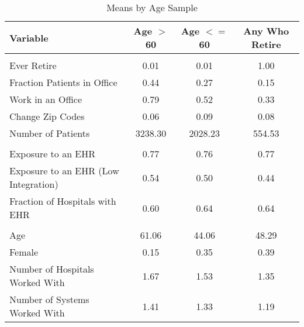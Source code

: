 \begin{table}[ht]

\caption{Means by Age Sample}
\centering
\begin{tabular}[t]{lccc}
\toprule
Variable & Age $>$ 60 & Age $<=$ 60 & Any Who Retire\\
\midrule
\addlinespace[0.3em]
\multicolumn{4}{l}{\textbf{Outcomes}}\\
\hspace{1em}Ever Retire & 0.01 & 0.01 & 1.00\\
\hspace{1em}Fraction Patients in Office & 0.44 & 0.27 & 0.15\\
\hspace{1em}Work in an Office & 0.79 & 0.52 & 0.33\\
\hspace{1em}Change Zip Codes & 0.06 & 0.09 & 0.08\\
\hspace{1em}Number of Patients & 3238.30 & 2028.23 & 554.53\\
\addlinespace[0.3em]
\multicolumn{4}{l}{\textbf{Treatment}}\\
\hspace{1em}Exposure to an EHR & 0.77 & 0.76 & 0.77\\
\hspace{1em}Exposure to an EHR (Low Integration) & 0.54 & 0.50 & 0.44\\
\hspace{1em}Fraction of Hospitals with EHR & 0.60 & 0.64 & 0.64\\
\addlinespace[0.3em]
\multicolumn{4}{l}{\textbf{Characteristics}}\\
\hspace{1em}Age & 61.06 & 44.06 & 48.29\\
\hspace{1em}Female & 0.15 & 0.35 & 0.39\\
\hspace{1em}Number of Hospitals Worked With & 1.67 & 1.53 & 1.35\\
\hspace{1em}Number of Systems Worked With & 1.41 & 1.33 & 1.19\\
\bottomrule
\end{tabular}
\end{table}

